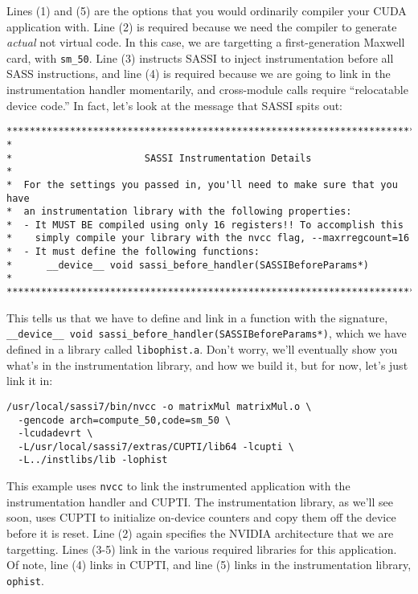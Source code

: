 Lines (1) and (5) are the options that you would ordinarily compiler
your CUDA application with.  Line (2) is required because we need the
compiler to generate \emph{actual} not virtual code.  In this case, we
are targetting a first-generation Maxwell card, with \texttt{sm\_50}.
Line (3) instructs SASSI to inject instrumentation before all SASS
instructions, and line (4) is required because we are going to link in
the instrumentation handler momentarily, and cross-module calls
require ``relocatable device code.''  In fact, let's look at the
message that SASSI spits out:
\begin{verbatim}
******************************************************************************
*
*                       SASSI Instrumentation Details
*
*  For the settings you passed in, you'll need to make sure that you have
*  an instrumentation library with the following properties:
*  - It MUST BE compiled using only 16 registers!! To accomplish this
*    simply compile your library with the nvcc flag, --maxrregcount=16
*  - It must define the following functions:
*      __device__ void sassi_before_handler(SASSIBeforeParams*)
*
******************************************************************************
\end{verbatim}

This tells us that we have to define and link in a function with the
signature,\\ 
\lstinline{__device__ void sassi_before_handler(SASSIBeforeParams*)},
which we have defined in a library called 
\texttt{libophist.a}.  Don't worry, we'll eventually show you what's in the
instrumentation library, and how we build it, but for now, let's just
link it in:
\begin{lstlisting}[style=BashInputStyle]
/usr/local/sassi7/bin/nvcc -o matrixMul matrixMul.o \
  -gencode arch=compute_50,code=sm_50 \
  -lcudadevrt \
  -L/usr/local/sassi7/extras/CUPTI/lib64 -lcupti \
  -L../instlibs/lib -lophist
\end{lstlisting}

This example uses \texttt{nvcc} to link the instrumented application
with the instrumentation handler and CUPTI. The instrumentation
library, as we'll see soon, uses CUPTI to
initialize on-device counters and copy them off the device before it
is reset. Line (2) again specifies the NVIDIA architecture that we are
targetting.  Lines (3-5) link in the various required libraries for
this application.  Of note, line (4) links in CUPTI, and line (5)
links in the instrumentation library, \texttt{ophist}.

